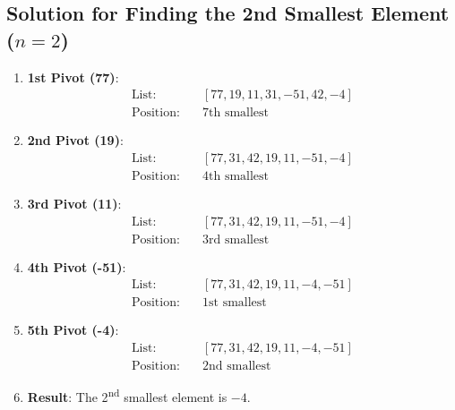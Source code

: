 \documentclass{article}
\begin{document}
\subsection*{Solution for Finding the 2nd Smallest Element (\( n=2 \))}
\begin{enumerate}
\item \textbf{1st Pivot (77)}: 
    \begin{align*}
        \text{List:} & \quad [77, 19, 11, 31, -51, 42, -4] \\
        \text{Position:} & \quad 7\text{th smallest}
    \end{align*}

\item \textbf{2nd Pivot (19)}: 
    \begin{align*}
        \text{List:} & \quad [77, 31, 42, 19, 11, -51, -4] \\
        \text{Position:} & \quad 4\text{th smallest}
    \end{align*}

\item \textbf{3rd Pivot (11)}: 
    \begin{align*}
        \text{List:} & \quad [77, 31, 42, 19, 11, -51, -4] \\
        \text{Position:} & \quad 3\text{rd smallest}
    \end{align*}

\item \textbf{4th Pivot (-51)}: 
    \begin{align*}
        \text{List:} & \quad [77, 31, 42, 19, 11, -4, -51] \\
        \text{Position:} & \quad 1\text{st smallest}
    \end{align*}

\item \textbf{5th Pivot (-4)}: 
    \begin{align*}
        \text{List:} & \quad [77, 31, 42, 19, 11, -4, -51] \\
        \text{Position:} & \quad 2\text{nd smallest}
    \end{align*}

\item \textbf{Result}: The 2\textsuperscript{nd} smallest element is \( -4 \).

\end{enumerate}
\end{document}

